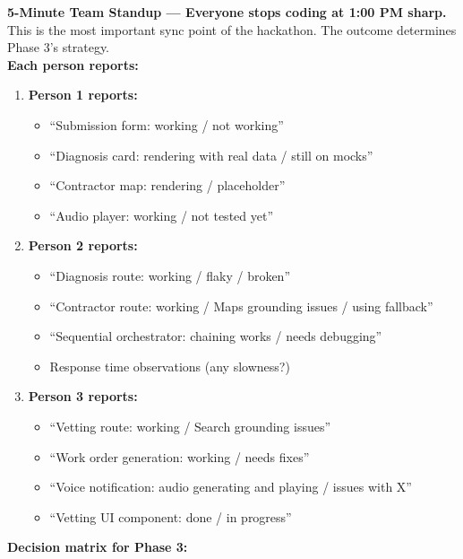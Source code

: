 \documentclass[11pt, a4paper]{article}
\begin{document}
\begin{syncbox}
{\large\textbf{5-Minute Team Standup --- Everyone stops coding at 1:00 PM sharp.}}\\[4pt]
{\normalsize This is the most important sync point of the hackathon. The outcome determines Phase 3's strategy.}\\[8pt]

\textbf{Each person reports:}
\begin{enumerate}[leftmargin=2em, itemsep=4pt]
  \item \textbf{Person 1 reports:}
    \begin{itemize}[itemsep=1pt]
      \item ``Submission form: working / not working''
      \item ``Diagnosis card: rendering with real data / still on mocks''
      \item ``Contractor map: rendering / placeholder''
      \item ``Audio player: working / not tested yet''
    \end{itemize}
  \item \textbf{Person 2 reports:}
    \begin{itemize}[itemsep=1pt]
      \item ``Diagnosis route: working / flaky / broken''
      \item ``Contractor route: working / Maps grounding issues / using fallback''
      \item ``Sequential orchestrator: chaining works / needs debugging''
      \item Response time observations (any slowness?)
    \end{itemize}
  \item \textbf{Person 3 reports:}
    \begin{itemize}[itemsep=1pt]
      \item ``Vetting route: working / Search grounding issues''
      \item ``Work order generation: working / needs fixes''
      \item ``Voice notification: audio generating and playing / issues with X''
      \item ``Vetting UI component: done / in progress''
    \end{itemize}
\end{enumerate}

\vspace{4pt}
\textbf{Decision matrix for Phase 3:}


\end{syncbox}
\end{document}

